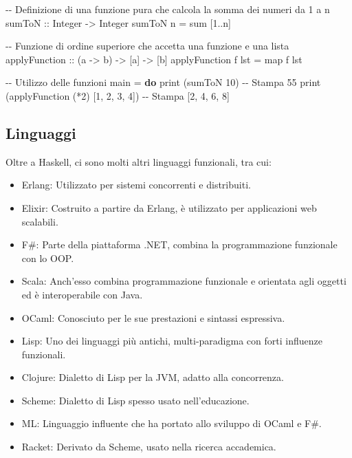 \documentclass[
  letterpaper,
  DIV=11,
  numbers=noendperiod]{scrreprt}
\newenvironment{Shaded}{\begin{snugshade}}{\end{snugshade}}
\newcommand{\CommentTok}[1]{\textcolor[rgb]{0.37,0.37,0.37}{#1}}
\newcommand{\DataTypeTok}[1]{\textcolor[rgb]{0.68,0.00,0.00}{#1}}
\newcommand{\DecValTok}[1]{\textcolor[rgb]{0.68,0.00,0.00}{#1}}
\newcommand{\FunctionTok}[1]{\textcolor[rgb]{0.28,0.35,0.67}{#1}}
\newcommand{\KeywordTok}[1]{\textcolor[rgb]{0.00,0.23,0.31}{\textbf{#1}}}
\newcommand{\NormalTok}[1]{\textcolor[rgb]{0.00,0.23,0.31}{#1}}
\newcommand{\OperatorTok}[1]{\textcolor[rgb]{0.37,0.37,0.37}{#1}}
\newcommand{\OtherTok}[1]{\textcolor[rgb]{0.00,0.23,0.31}{#1}}
\providecommand{\tightlist}{%
  \setlength{\itemsep}{0pt}\setlength{\parskip}{0pt}}\usepackage{longtable,booktabs,array}
\begin{document}
\begin{Shaded}
\begin{Highlighting}[]
\CommentTok{{-}{-} Definizione di una funzione pura che calcola la somma dei numeri da 1 a n}
\OtherTok{sumToN ::} \DataTypeTok{Integer} \OtherTok{{-}\textgreater{}} \DataTypeTok{Integer}
\NormalTok{sumToN n }\OtherTok{=} \FunctionTok{sum}\NormalTok{ [}\DecValTok{1}\OperatorTok{..}\NormalTok{n]}

\CommentTok{{-}{-} Funzione di ordine superiore che accetta una funzione e una lista}
\OtherTok{applyFunction ::}\NormalTok{ (a }\OtherTok{{-}\textgreater{}}\NormalTok{ b) }\OtherTok{{-}\textgreater{}}\NormalTok{ [a] }\OtherTok{{-}\textgreater{}}\NormalTok{ [b]}
\NormalTok{applyFunction f lst }\OtherTok{=} \FunctionTok{map}\NormalTok{ f lst}

\CommentTok{{-}{-} Utilizzo delle funzioni}
\NormalTok{main }\OtherTok{=} \KeywordTok{do}
    \FunctionTok{print}\NormalTok{ (sumToN }\DecValTok{10}\NormalTok{) }\CommentTok{{-}{-} Stampa 55}
    \FunctionTok{print}\NormalTok{ (applyFunction (}\OperatorTok{*}\DecValTok{2}\NormalTok{) [}\DecValTok{1}\NormalTok{, }\DecValTok{2}\NormalTok{, }\DecValTok{3}\NormalTok{, }\DecValTok{4}\NormalTok{]) }\CommentTok{{-}{-} Stampa [2, 4, 6, 8]}
\end{Highlighting}
\end{Shaded}

\subsection{Linguaggi}\label{linguaggi-1}

Oltre a Haskell, ci sono molti altri linguaggi funzionali, tra cui:

\begin{itemize}
\tightlist
\item
  Erlang: Utilizzato per sistemi concorrenti e distribuiti.
\item
  Elixir: Costruito a partire da Erlang, è utilizzato per applicazioni
  web scalabili.
\item
  F\#: Parte della piattaforma .NET, combina la programmazione
  funzionale con lo OOP.
\item
  Scala: Anch'esso combina programmazione funzionale e orientata agli
  oggetti ed è interoperabile con Java.
\item
  OCaml: Conosciuto per le sue prestazioni e sintassi espressiva.
\item
  Lisp: Uno dei linguaggi più antichi, multi-paradigma con forti
  influenze funzionali.
\item
  Clojure: Dialetto di Lisp per la JVM, adatto alla concorrenza.
\item
  Scheme: Dialetto di Lisp spesso usato nell'educazione.
\item
  ML: Linguaggio influente che ha portato allo sviluppo di OCaml e F\#.
\item
  Racket: Derivato da Scheme, usato nella ricerca accademica.
\end{itemize}
\end{document}
